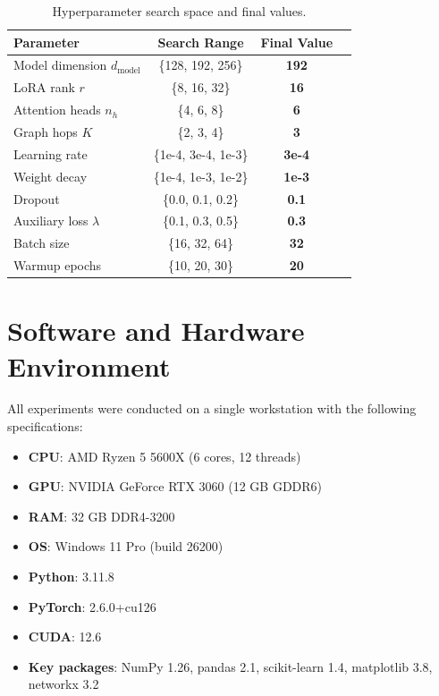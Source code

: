 \begin{table}[H]
\centering
\caption{Hyperparameter search space and final values.}
\label{Tab.hypersearch}
\begin{tabular}{lccc}
\toprule
Parameter & Search Range & Final Value \\
\midrule
Model dimension $d_{\text{model}}$ & \{128, 192, 256\} & \textbf{192} \\
LoRA rank $r$ & \{8, 16, 32\} & \textbf{16} \\
Attention heads $n_h$ & \{4, 6, 8\} & \textbf{6} \\
Graph hops $K$ & \{2, 3, 4\} & \textbf{3} \\
Learning rate & \{1e-4, 3e-4, 1e-3\} & \textbf{3e-4} \\
Weight decay & \{1e-4, 1e-3, 1e-2\} & \textbf{1e-3} \\
Dropout & \{0.0, 0.1, 0.2\} & \textbf{0.1} \\
Auxiliary loss $\lambda$ & \{0.1, 0.3, 0.5\} & \textbf{0.3} \\
Batch size & \{16, 32, 64\} & \textbf{32} \\
Warmup epochs & \{10, 20, 30\} & \textbf{20} \\
\bottomrule
\end{tabular}
\end{table}

\section{Software and Hardware Environment}
\label{app:environment}

All experiments were conducted on a single workstation with the following specifications:

\begin{itemize}
    \item \textbf{CPU}: AMD Ryzen 5 5600X (6 cores, 12 threads)
    \item \textbf{GPU}: NVIDIA GeForce RTX 3060 (12 GB GDDR6)
    \item \textbf{RAM}: 32 GB DDR4-3200
    \item \textbf{OS}: Windows 11 Pro (build 26200)
    \item \textbf{Python}: 3.11.8
    \item \textbf{PyTorch}: 2.6.0+cu126
    \item \textbf{CUDA}: 12.6
    \item \textbf{Key packages}: NumPy 1.26, pandas 2.1, scikit-learn 1.4, matplotlib 3.8, networkx 3.2
\end{itemize}

